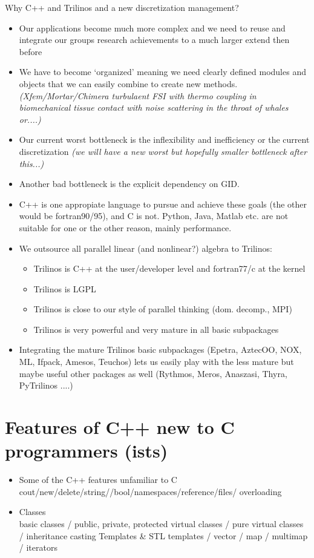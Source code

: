 Why C++ and Trilinos and a new discretization management?
\begin{itemize}
\item Our applications become much more complex and we need to reuse and
   integrate our groups research achievements to a much larger extend then
   before 
\item We have to become `organized' meaning we need clearly defined modules
   and objects that we can easily combine to create new
   methods. \emph{(Xfem/Mortar/Chimera turbulaent FSI with thermo coupling in
   biomechanical tissue contact 
   with noise scattering in the throat of whales or....)}
\item Our current worst bottleneck is the inflexibility and inefficiency or the current
discretization \emph{(we will have a new worst but hopefully smaller
bottleneck after this...)}
\item Another bad bottleneck is the explicit dependency on GID.
\item C++ is one appropiate language to pursue and achieve these goals (the other would
be fortran90/95), and C is not. Python, Java, Matlab etc. are not suitable for one or the
other reason, mainly performance.
\item We outsource all parallel linear (and nonlinear?) algebra to Trilinos:
   \begin{itemize}
   \item Trilinos is C++ at the user/developer level and fortran77/c at the
   kernel
   \item Trilinos is LGPL
   \item Trilinos is close to our style of parallel thinking (dom. decomp., MPI)
   \item Trilinos is very powerful and very mature in all basic subpackages
   \end{itemize}
\item Integrating the mature Trilinos basic subpackages (Epetra, AztecOO, NOX, ML, Ifpack,
Amesos, Teuchos) lets us easily play with the less mature but maybe useful other
packages as well (Rythmos, Meros, Anaszasi, Thyra, PyTrilinos ....)
\end{itemize}

\section{Features of C++ new to C programmers (\ccarat{}ists)}
\begin{itemize}
\item Some of the C++ features unfamiliar to C\\
      cout/new/delete/string/{}/bool/namespaces/reference/files/
      overloading
\item Classes\\
    basic classes / public, private, protected
    virtual classes / pure virtual classes / inheritance
    casting
    Templates \& STL
    templates / vector / map / multimap / iterators
\end{itemize}

